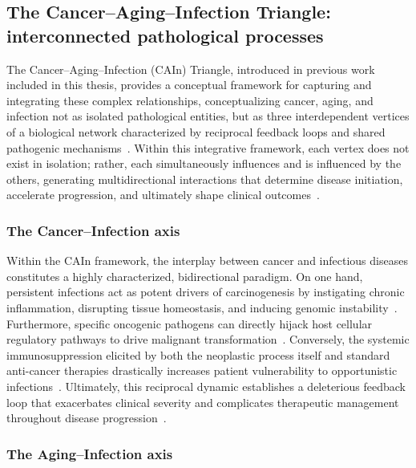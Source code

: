 \subsection{The Cancer–Aging–Infection Triangle: interconnected pathological processes}

The Cancer–Aging–Infection (CAIn) Triangle, introduced in previous work included in this thesis, provides a conceptual framework for capturing and integrating these complex relationships, conceptualizing cancer, aging, and infection not as isolated pathological entities, but as three interdependent vertices of a biological network characterized by reciprocal feedback loops and shared pathogenic mechanisms~\cite{DANI_LIPIDOS}. Within this integrative framework, each vertex does not exist in isolation; rather, each simultaneously influences and is influenced by the others, generating multidirectional interactions that determine disease initiation, accelerate progression, and ultimately shape clinical outcomes~\cite{aging_and_cancer,vance2017listening,pawelec2017immunosenescence,wang2022immunosenescence}.


\subsubsection{The Cancer--Infection axis}

Within the CAIn framework, the interplay between cancer and infectious diseases constitutes a highly characterized, bidirectional paradigm. On one hand, persistent infections act as potent drivers of carcinogenesis by instigating chronic inflammation, disrupting tissue homeostasis, and inducing genomic instability~\cite{Greten2019}. Furthermore, specific oncogenic pathogens can directly hijack host cellular regulatory pathways to drive malignant transformation~\cite{deMartel2020}. Conversely, the systemic immunosuppression elicited by both the neoplastic process itself and standard anti-cancer therapies drastically increases patient vulnerability to opportunistic infections~\cite{Rolston2017}. Ultimately, this reciprocal dynamic establishes a deleterious feedback loop that exacerbates clinical severity and complicates therapeutic management throughout disease progression~\cite{Diakos2014}.

\subsubsection{The Aging--Infection axis}

